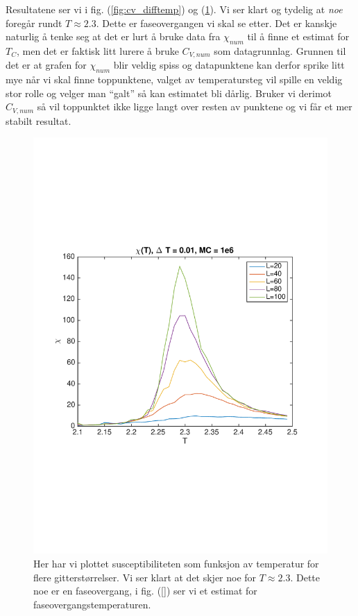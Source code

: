 \documentclass[norsk, 10pt]{article}
\begin{document}
Resultatene ser vi i fig. (\ref{fig:cv_difftemp}) og (\ref{fig:chi_difftemp}). Vi ser klart og tydelig at \emph{noe} foregår rundt $T\approx 2.3$. Dette er faseovergangen vi skal se etter. Det er kanskje naturlig å tenke seg at det er lurt å bruke data fra $\chi_{num}$ til å finne et estimat for $T_C$, men det er faktisk litt lurere å bruke $C_{V,num}$ som datagrunnlag. Grunnen til det er at grafen for $\chi_{num}$ blir veldig spiss og datapunktene kan derfor sprike litt mye når vi skal finne toppunktene, valget av temperatursteg vil spille en veldig stor rolle og velger man ``galt'' så kan estimatet bli dårlig. Bruker vi derimot $C_{V,num}$ så vil toppunktet ikke ligge langt over resten av punktene og vi får et mer stabilt resultat.

\begin{figure}[H]
	\centering
	\includegraphics[scale = 0.6, trim = 1cm 8cm 1cm 8cm]{chi_difftemp.pdf}
	\caption{Her har vi plottet susceptibiliteten som funksjon av temperatur for flere gitterstørrelser. Vi ser klart at det skjer noe for $T\approx 2.3$. Dette noe er en faseovergang, i fig. (\ref{}) ser vi et estimat for faseovergangstemperaturen.}
	\label{fig:chi_difftemp}
\end{figure}
\end{document}
